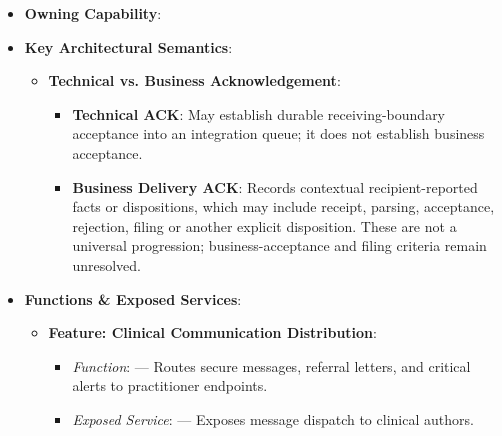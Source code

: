 \begin{itemize}

\item
\textbf{Owning Capability}: \texttt{}



\item
\textbf{Key Architectural Semantics}:


\begin{itemize}

\item
\textbf{Technical vs. Business Acknowledgement}:


\begin{itemize}

\item
\textbf{Technical ACK}: May establish durable receiving-boundary acceptance into an integration queue; it does not establish business acceptance.



\item
\textbf{Business Delivery ACK}: Records contextual recipient-reported facts or dispositions, which may include receipt, parsing, acceptance, rejection, filing or another explicit disposition. These are not a universal progression; business-acceptance and filing criteria remain unresolved.



\end{itemize}


\end{itemize}


\item
\textbf{Functions \& Exposed Services}:


\begin{itemize}

\item
\textbf{Feature: Clinical Communication Distribution}:


\begin{itemize}

\item
\emph{Function}: \texttt{} — Routes secure messages, referral letters, and critical alerts to practitioner endpoints.



\item
\emph{Exposed Service}: \texttt{} — Exposes message dispatch to clinical authors.




\end{itemize}
\end{itemize}
\end{itemize}
